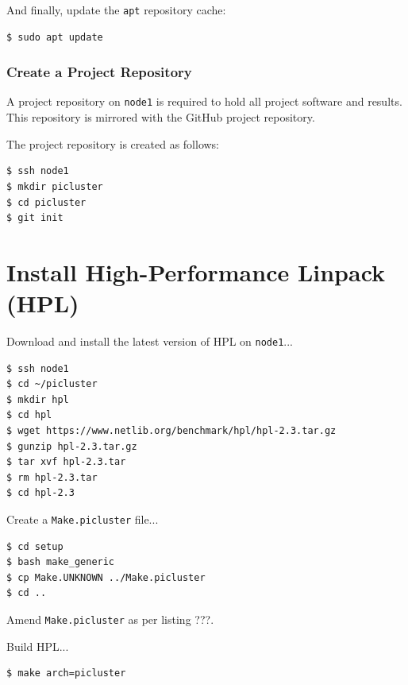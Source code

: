 \documentclass{report}
\begin{document}
And finally, update the \verb|apt| repository cache:

\lstset{style=type}
\begin{lstlisting}[]
$ sudo apt update
\end{lstlisting}



\subsection{Create a Project Repository}

A project repository on \verb|node1| is required to hold all project software and results. This repository is mirrored with the GitHub project repository.

The project repository is created as follows:

\lstset{style=type}
\begin{lstlisting}[]
$ ssh node1
$ mkdir picluster
$ cd picluster
$ git init
\end{lstlisting}



%
%
\chapter{Install High-Performance Linpack (HPL)}

Download and install the latest version of HPL on \verb|node1|...

\lstset{style=type}
\begin{lstlisting}
$ ssh node1
$ cd ~/picluster
$ mkdir hpl
$ cd hpl
$ wget https://www.netlib.org/benchmark/hpl/hpl-2.3.tar.gz
$ gunzip hpl-2.3.tar.gz
$ tar xvf hpl-2.3.tar
$ rm hpl-2.3.tar
$ cd hpl-2.3
\end{lstlisting}

Create a \verb|Make.picluster| file...

\lstset{style=type}
\begin{lstlisting}
$ cd setup
$ bash make_generic
$ cp Make.UNKNOWN ../Make.picluster
$ cd ..
\end{lstlisting}

Amend \verb|Make.picluster| as per listing ???.

\lstset{style=listing}


Build HPL...

\lstset{style=type}
\begin{lstlisting}
$ make arch=picluster   
\end{lstlisting}
\end{document}
